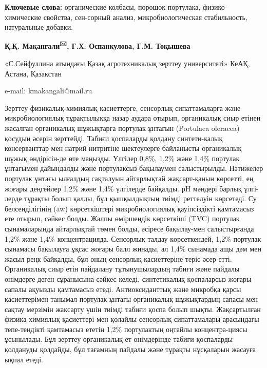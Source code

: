 {\bfseries Ключевые слова:} органические колбасы, порошок портулака,
физико-химические свойства, сен-сорный анализ, микробиологическая
стабильность, натуральные добавки.

\begin{center}

{\bfseries Қ.Қ. Мақанғали\textsuperscript{🖂}, Г.Х. Оспанкулова, Г.М.
Тоқышева}

«С.Сейфуллина атындағы Қазақ агротехникалық зерттеу университеті» КеАҚ,
Астана, Қазақстан

e-mail: kmakangali@mail.ru
\end{center}

Зерттеу физикалық-химиялық қасиеттерге, сенсорлық сипаттамаларға және
микробиологиялық тұрақтылыққа назар аудара отырып, органикалық сиыр
етінен жасалған органикалық шұжықтарға портулак ұнтағын (Portulaca
oleracea) қосудың әсерін зерттейді. Табиғи қоспаларды қолдану
синтети-калық консерванттар мен натрий нитритіне шектеулерге байланысты
органикалық шұжық өндірісін-де өте маңызды. Үлгілер 0,8\%, 1,2\% және
1,4\% портулак ұнтағымен дайындалды және портулаксыз бақылаумен
салыстырылды. Нәтижелер портулак ұнтағы ылғалдың сақталуын айтарлықтай
жақсарт-қанын көрсетті, ең жоғары деңгейлер 1,2\% және 1,4\% үлгілерде
байқалды. рH мәндері барлық үлгі-лерде тұрақты болып қалды, бұл
қышқылдықтың тиімді реттелуін көрсетеді. Су белсенділігінің (aw)
көрсеткіштері микробиологиялық қауіпсіздікті қамтамасыз ете отырып,
сәйкес болды. Жалпы өміршеңдік көрсеткіші (TVC) портулак сынамаларында
айтарлықтай төмен болды, әсіресе бақылау-мен салыстырғанда 1,2\% және
1,4\% концентрацияда. Сенсорлық талдау көрсеткендей, 1,2\% портулак
сынамасы бақылауға ұқсас жоғары балл жинады, ал 1,4\% сынамада ащы дәм
мен жасыл реңк байқалды, бұл оның сенсорлық қасиеттеріне теріс әсер
етті. Органикалық сиыр етін пайдалану тұтынушылардың табиғи және пайдалы
өнімдерге деген сұранысына сәйкес келеді, синтетикалық қоспаларсыз
жоғары сапалы ақуызды қамтамасыз етеді. Антиоксиданттық және микробқа
қарсы қасиеттерімен танымал портулак ұнтағы органикалық шұжықтардың
сапасы мен сақтау мерзімін жақсарту үшін тиімді табиғи қоспа болып
шықты. Жақсартылған физика-химиялық қасиеттері мен қолайлы сенсорлық
сипаттамалары арасындағы тепе-теңдікті қамтамасыз ететін 1,2\%
портулактың оңтайлы концентра-циясы ұсынылады. Бұл зерттеу органикалық ет
өнімдерінде табиғи қоспаларды қолдануды қолдайды, бұл тағамның пайдалы
және тұрақты нұсқаларын жасауға ықпал етеді.

